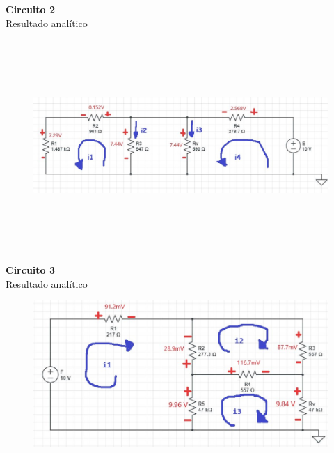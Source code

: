\documentclass[a4paper,12pt]{report}
\begin{document}
\begin{enumerate}
\begin{figure}[H]
\end{figure}
\textbf{Circuito 2}\\
Resultado analítico
\begin{figure}[H]
\begin{center}
\includegraphics[width=17cm, height=8cm]{circ2,2kesken.png}
\end{center}
\end{figure}
\newpage
\textbf{Circuito 3}\\
Resultado analítico
\begin{figure}[H]
\begin{center}
\includegraphics[scale=0.45]{circ3,3kesken.png}

\end{center}
\end{figure}
\end{enumerate}
\end{document}
